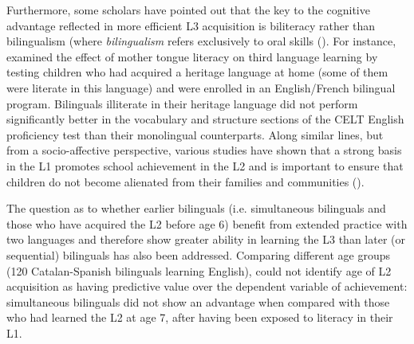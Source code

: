 \documentclass[output=paper,modfonts,nonflat,newtxmath]{langsci/langscibook}
\begin{document}
Furthermore, some scholars have pointed out that the key to the cognitive advantage reflected in more efficient L3 acquisition is biliteracy rather than bilingualism (where \textit{bilingualism} refers exclusively to oral skills (\citealt{SwainEtAl1990, RauchEtAl2012}). For instance, \citet{SwainEtAl1990} examined the effect of mother tongue literacy on third language learning by testing children who had acquired a heritage language at home (some of them were literate in this language) and were enrolled in an English/French bilingual program. Bilinguals illiterate in their heritage language did not perform significantly better in the vocabulary and structure sections of the CELT English proficiency test than their monolingual counterparts. Along similar lines, but from a socio-affective perspective, various studies have shown that a strong basis in the L1 promotes school achievement in the L2 and is important to ensure that children do not become alienated from their families and communities (\citealt{CastroEtAl2011, MurphyEvangelou2016}).

The question as to whether earlier bilinguals (i.e. simultaneous bilinguals and those who have acquired the L2 before age 6) benefit from extended practice with two languages and therefore show greater ability in learning the L3 than later (or sequential) bilinguals has also been addressed. Comparing different age groups (120 Catalan-Spanish bilinguals learning English), \citet{Sanz2008} could not identify age of L2 acquisition as having predictive value over the dependent variable of achievement: simultaneous bilinguals did not show an advantage when compared with those who had learned the L2 at age 7, after having been exposed to literacy in their L1.
\end{document}

